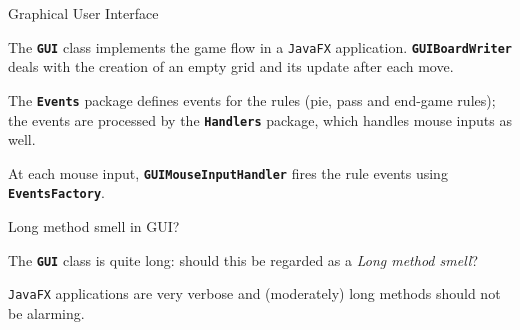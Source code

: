 \documentclass{beamer}
\begin{document}
  \begin{frame}{Graphical User Interface}


    The \textbf{\texttt{GUI}} class implements the game flow in a \texttt{JavaFX} application. \textbf{\texttt{GUIBoardWriter}} deals with the creation of an empty grid and its update after each move.

    \vspace{1em}

    The \textbf{\texttt{Events}} package defines events for the rules (pie, pass and end-game rules); the events are processed by the \textbf{\texttt{Handlers}} package, which handles mouse inputs as well.

    \vspace{1em}

    At each mouse input, \textbf{\texttt{GUIMouseInputHandler}} fires the rule events using \textbf{\texttt{EventsFactory}}.

  \end{frame}



  \begin{frame}{Long method smell in GUI?}

    The \textbf{\texttt{GUI}} class is quite long: should this be regarded as a \textit{Long method smell}?

    \vspace{1em}

    \begin{centering}


    \end{centering}

    \vspace{1em}

    \texttt{JavaFX} applications are very verbose and (moderately) long methods should not be alarming.

  \end{frame}
\end{document}
